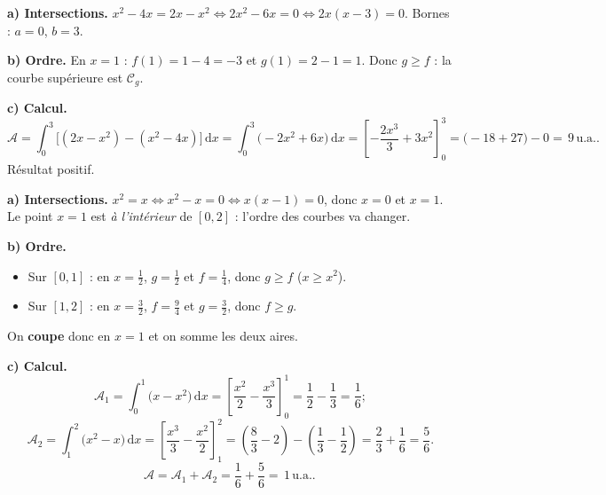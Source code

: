 \documentclass[11pt,a4paper]{article}
\newcommand{\dd}{\mathrm{d}}
\newcommand{\ua}{\,\text{u.a.}}
\begin{document}
\begin{corr}[D3]
\textbf{a) Intersections.} $x^2-4x=2x-x^2\Leftrightarrow 2x^2-6x=0\Leftrightarrow 2x(x-3)=0$.
Bornes : $a=0$, $b=3$.

\textbf{b) Ordre.} En $x=1$ : $f(1)=1-4=-3$ et $g(1)=2-1=1$. Donc $g\geqslant f$ : la courbe
supérieure est $\mathcal{C}_g$.

\textbf{c) Calcul.}
\[
\mathcal{A}=\int_0^3\bigl[(2x-x^2)-(x^2-4x)\bigr]\,\dd x=\int_0^3\bigl(-2x^2+6x\bigr)\,\dd x
=\left[-\frac{2x^3}{3}+3x^2\right]_0^3=\bigl(-18+27\bigr)-0=\boxed{\,9\ua.\,}
\]
Résultat positif. \checkmark
\end{corr}

\begin{corr}[D4]
\textbf{a) Intersections.} $x^2=x\Leftrightarrow x^2-x=0\Leftrightarrow x(x-1)=0$, donc $x=0$ et
$x=1$. Le point $x=1$ est \emph{à l'intérieur} de $[0,2]$ : l'ordre des courbes va changer.

\textbf{b) Ordre.}
\begin{itemize}[leftmargin=1.6em,topsep=1pt]
  \item Sur $[0,1]$ : en $x=\tfrac12$, $g=\tfrac12$ et $f=\tfrac14$, donc $g\geqslant f$ ($x\geqslant x^2$).
  \item Sur $[1,2]$ : en $x=\tfrac32$, $f=\tfrac94$ et $g=\tfrac32$, donc $f\geqslant g$.
\end{itemize}
On \textbf{coupe} donc en $x=1$ et on somme les deux aires.

\textbf{c) Calcul.}
\[
\mathcal{A}_1=\int_0^1\bigl(x-x^2\bigr)\,\dd x=\left[\frac{x^2}{2}-\frac{x^3}{3}\right]_0^1
=\frac{1}{2}-\frac{1}{3}=\frac{1}{6};
\]
\[
\mathcal{A}_2=\int_1^2\bigl(x^2-x\bigr)\,\dd x=\left[\frac{x^3}{3}-\frac{x^2}{2}\right]_1^2
=\left(\frac{8}{3}-2\right)-\left(\frac{1}{3}-\frac{1}{2}\right)=\frac{2}{3}+\frac{1}{6}=\frac{5}{6}.
\]
\[
\mathcal{A}=\mathcal{A}_1+\mathcal{A}_2=\frac{1}{6}+\frac{5}{6}=\boxed{\,1\ua.\,}
\]


\end{corr}
\end{document}
